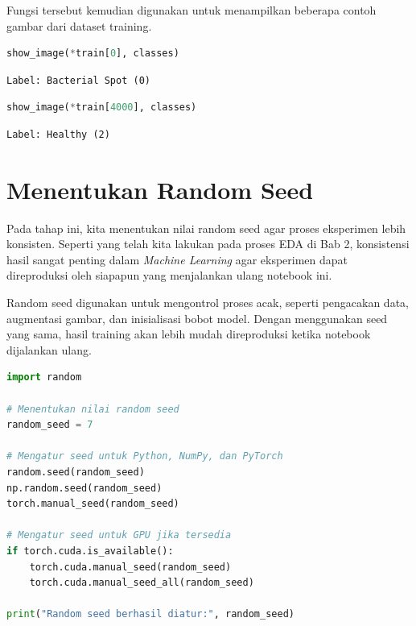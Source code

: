 Fungsi tersebut kemudian digunakan untuk menampilkan beberapa contoh gambar dari dataset training.

\begin{lstlisting}[language=Python, caption=Menampilkan contoh gambar dataset]
show_image(*train[0], classes)
\end{lstlisting}

\begin{outputcode}[H]
\begin{lstlisting}[language={}]
Label: Bacterial Spot (0)
\end{lstlisting}
\caption{Output gambar pertama (Bacterial Spot)}
\end{outputcode}

\begin{lstlisting}[language=Python, caption=Menampilkan contoh gambar lainnya]
show_image(*train[4000], classes)
\end{lstlisting}

\begin{outputcode}[H]
\begin{lstlisting}[language={}]
Label: Healthy (2)
\end{lstlisting}
\caption{Output gambar Healthy}
\end{outputcode}

\section{Menentukan Random Seed}

Pada tahap ini, kita menentukan nilai random seed agar proses eksperimen lebih konsisten. Seperti yang telah kita lakukan pada proses EDA di Bab 2, konsistensi hasil sangat penting dalam \textit{Machine Learning} agar eksperimen dapat direproduksi oleh siapapun yang menjalankan ulang notebook ini.

Random seed digunakan untuk mengontrol proses acak, seperti pengacakan data, augmentasi gambar, dan inisialisasi bobot model. Dengan menggunakan seed yang sama, hasil training akan lebih mudah direproduksi ketika notebook dijalankan ulang.

\begin{lstlisting}[language=Python, caption=Menentukan random seed]
import random

# Menentukan nilai random seed
random_seed = 7

# Mengatur seed untuk Python, NumPy, dan PyTorch
random.seed(random_seed)
np.random.seed(random_seed)
torch.manual_seed(random_seed)

# Mengatur seed untuk GPU jika tersedia
if torch.cuda.is_available():
    torch.cuda.manual_seed(random_seed)
    torch.cuda.manual_seed_all(random_seed)

print("Random seed berhasil diatur:", random_seed)
\end{lstlisting}

